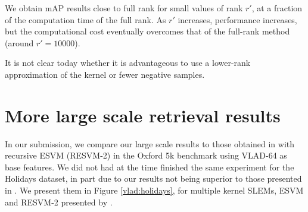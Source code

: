 \documentclass[runningheads]{llncs}
\begin{document}
We obtain mAP results close to full rank for small values of rank $r'$, at a fraction of the computation time of the full rank. 
As $r'$ increases, performance increases, but the computational cost eventually overcomes that of the full-rank method (around $r'=10000$).

It is not clear today whether it is advantageous to use a lower-rank approximation of the kernel or fewer negative samples.

%

\section{More large scale retrieval results}
In our submission, we compare our large scale results to those obtained in \cite{ZePe15} with recursive ESVM (RESVM-2) in the Oxford 5k benchmark using VLAD-64 as base features. 
We did not had at the time finished the same experiment for the Holidays dataset, in part due to our results not being superior to those presented in \cite{ZePe15}. 
We present them in Figure \ref{vlad:holidays}, for multiple kernel SLEMs, ESVM and RESVM-2 presented by \cite{ZePe15}. 

\end{document}
